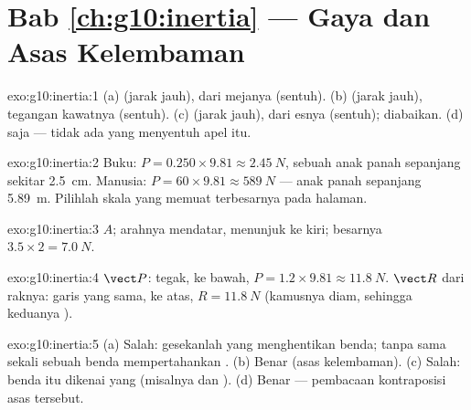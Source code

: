 \section*{Bab \ref{ch:g10:inertia} --- Gaya dan Asas Kelembaman}

\begin{solution}{exo:g10:inertia:1}
(a)  (jarak jauh),  dari mejanya (sentuh).
(b)  (jarak jauh), tegangan kawatnya (sentuh).
(c)  (jarak jauh),  dari esnya (sentuh); 
diabaikan. (d)  saja --- tidak ada yang menyentuh apel itu.
\end{solution}

\begin{solution}{exo:g10:inertia:2}
Buku: $P = 0.250 \times 9.81 \approx \qty{2.45}{N}$, sebuah anak panah
sepanjang sekitar \qty{2.5}{cm}. Manusia:
$P = 60 \times 9.81 \approx \qty{589}{N}$ --- anak panah sepanjang
\qty{5.89}{m}. Pilihlah skala yang memuat  terbesarnya pada halaman.
\end{solution}

\begin{solution}{exo:g10:inertia:3}
 $A$; arahnya mendatar, menunjuk ke kiri; besarnya
$3.5 \times 2 = \qty{7.0}{N}$.
\end{solution}

\begin{solution}{exo:g10:inertia:4}
 $\vect P$: tegak, ke bawah, $P = 1.2 \times 9.81 \approx
\qty{11.8}{N}$.  $\vect R$ dari raknya: garis yang sama, ke
atas, $R = \qty{11.8}{N}$ (kamusnya diam, sehingga keduanya ).
\end{solution}

\begin{solution}{exo:g10:inertia:5}
(a) Salah: gesekanlah yang menghentikan benda; tanpa  sama sekali
sebuah benda mempertahankan . (b) Benar (asas
kelembaman). (c) Salah: benda itu dikenai  yang \emph{} (misalnya  dan ). (d) Benar --- pembacaan
kontraposisi asas tersebut.
\end{solution}

